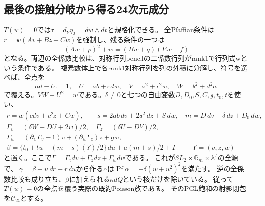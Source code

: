 \documentclass[a4paper,11pt]{ltjsarticle}
\theoremstyle{definition}
\begin{document}
\subsection{最後の接触分岐から得る24次元成分}
$T(w)=0$では$\tau=d_Y\eta_0=dw\wedge dv$と規格化できる。
全Pfaffian条件は$r=w(Av+Bz+Cw)$を強制し、残る条件の一つは
\[
 (Aw+p)^2+w=(Bw+q)(Ew+f)
\]
となる。両辺の全係数比較は、対称行列pencilの二係数行列がrank1で行列式wという条件である。
複素数体上で各rank1対称行列を列の外積に分解し、符号を選べば、全点を
\[
 ad-bc=1,\quad U=ab+cdw,\quad V=a^2+c^2w,\quad W=b^2+d^2w
\]
で覆える。$VW-U^2=w$である。$\delta\ne0$と七つの自由変数$D,D_0,S,C,g,t_0,t$を使い、
\[
\begin{gathered}
 r=w(cd v+c^2z+Cw),\qquad
 s=2ab\,dv+2a^2\,dz+S\,dw,\quad m=D\,dv+\delta\,dz+D_0\,dw,\\
 \Gamma_v=(\delta W-DU+2w)/2,\quad
 \Gamma_z=(\delta U-DV)/2,\\
 \Gamma_w=(\partial_w\Gamma_v-1)v+(\partial_w\Gamma_z)z+gw,\\
 \beta=\{t_0+tu+(m-s)(Y)/2\}\,du+u(m+s)/2+\Gamma,
 \qquad Y=(v,z,w)
\end{gathered}
\]
と置く。ここで$\Gamma=\Gamma_vdv+\Gamma_zdz+\Gamma_wdw$である。
これが$SL_2\times\mathbb G_m\times\mathbb A^7$の全源で、
$\gamma=\beta+u\,dr-r\,du$から作る$\alpha$は$\operatorname{Pf}\alpha=-\delta(w+u^2)^2$を満たす。
逆の全係数比較も成り立ち、$\beta$に加えられる$\kappa dQ$という核だけを除いている。
従って$T(w)=0$の全点を覆う実際の既約Poisson族である。
そのPGL飽和の射影閉包を$\mathcal C_{24}$とする。
\end{document}
